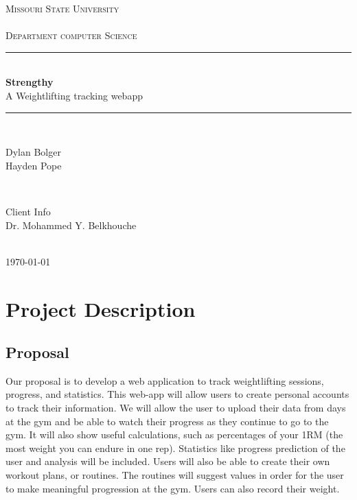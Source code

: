 \documentclass[12pt]{article}
\begin{document}
\begin{titlepage}

\newcommand{\HRule}{\rule{\linewidth}{0.5mm}}

\center

\textsc{\LARGE Missouri State University\\~\\Department computer Science}\\[1.0cm]

\HRule \\[0.4cm]
{ \huge \bfseries Strengthy}\\[0.4cm]
{ \large A Weightlifting tracking webapp}\\[0.4cm]
\HRule \\[1.5cm]

\begin{minipage}{0.4\textwidth}
\begin{flushleft} \large
Dylan Bolger \\ Hayden Pope
\end{flushleft}
\end{minipage}
~
\begin{minipage}{0.4\textwidth}
\begin{flushright} \large
Client Info \\
Dr. Mohammed Y. Belkhouche\\

\end{flushright}
\end{minipage}\\[2cm]

{\large \today}\\[2cm]

\end{titlepage}

\newpage
\tableofcontents

\newpage

\section{Project Description}
\subsection{Proposal}
Our proposal is to develop a web application to track weightlifting sessions, progress, and statistics. This web-app will allow users to create personal accounts to track their information. We will allow the user to upload their data from days at the gym and be able to watch their progress as they continue to go to the gym. It will also show useful calculations, such as percentages of your 1RM (the most weight you can endure in one rep). Statistics like progress prediction of the user and analysis will be included. Users will also be able to create their own workout plans, or routines. The routines will suggest values in order for the user to make meaningful progression at the gym. Users can also record their weight.
\end{document}
